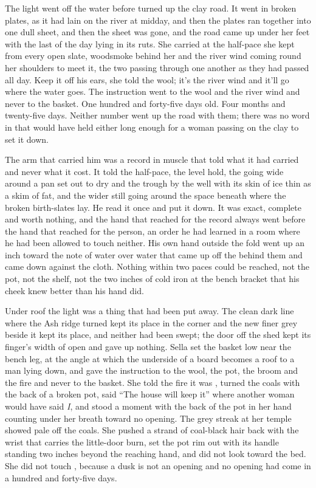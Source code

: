 The light went off the water before  turned up the clay road. It went in broken plates, as it had lain on the river at midday, and then the plates ran together into one dull sheet, and then the sheet was gone, and the road came up under her feet with the last of the day lying in its ruts. She carried  at the half-pace she kept from every open slate, woodsmoke behind her and the river wind coming round her shoulders to meet it, the two passing through one another as they had passed all day. Keep it off his ears, she told the wool; it's the river wind and it'll go where the water goes. The instruction went to the wool and the river wind and never to the basket. One hundred and forty-five days old. Four months and twenty-five days. Neither number went up the road with them; there was no word in  that would have held either long enough for a woman passing on the clay to set it down.

The arm that carried him was a record in muscle that told what it had carried and never what it cost. It told the half-pace, the level hold, the going wide around a pan set out to dry and the trough by the well with its skin of ice thin as a skim of fat, and the wider still going around the space beneath  where the broken birth-slates lay. He read it once and put it down. It was exact, complete and worth nothing, and the hand that reached for the record always went before the hand that reached for the person, an order he had learned in a room where he had been allowed to touch neither. His own hand outside the fold went up an inch toward the note of water over water that came up off the  behind them and came down against the cloth. Nothing within two paces could be reached, not the pot, not the shelf, not the two inches of cold iron at the bench bracket that his cheek knew better than his hand did.

Under  roof the light was a thing that had been put away. The clean dark line where the Ash ridge turned kept its place in the corner and the new finer grey beside it kept its place, and neither had been swept; the door off the shed kept its finger's width of open and gave up nothing. Sella set the basket low near the bench leg, at the angle at which the underside of a board becomes a roof to a man lying down, and gave the instruction to the wool, the pot, the broom and the fire and never to the basket. She told the fire it was , turned the coals with the back of a broken pot, said “The house will keep it” where another woman would have said \emph{I}, and stood a moment with the back of the pot in her hand counting under her breath toward no opening. The grey streak at her temple showed pale off the coals. She pushed a strand of coal-black hair back with the wrist that carries the little-door burn, set the pot rim out with its handle standing two inches beyond the reaching hand, and did not look toward the bed. She did not touch , because a dusk is not an opening and no opening had come in a hundred and forty-five days.


